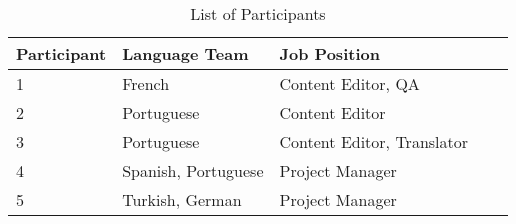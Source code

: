 \begin{table}[h!]
\begin{tabular}{|l|l|l|p{2cm}|p{4cm}|}
\hline
\rowcolor[HTML]{EFEFEF}
{\bf Participant} & {\bf Language Team} & {\bf Job Position} \\ \hline
1 & French & Content Editor, QA \\ \hline
2 & Portuguese & Content Editor \\ \hline
3 & Portuguese & Content Editor, Translator \\ \hline
4 & Spanish, Portuguese & Project Manager \\ \hline
5 & Turkish, German & Project Manager \\ \hline
\end{tabular}
\centering
\caption{List of Participants}
\label{table:user-test-participants}
\end{table}




